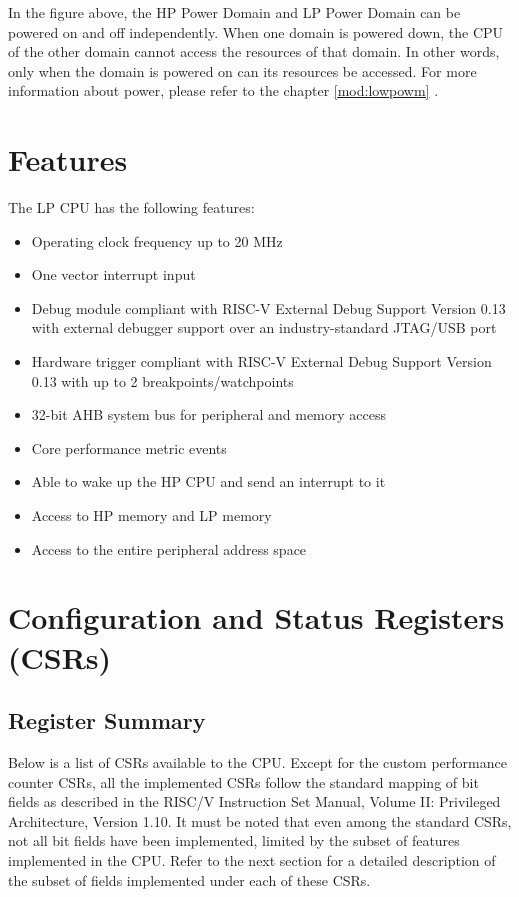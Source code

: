 \documentclass[main\_\_EN.tex]{subfiles}
\begin{document}
In the figure above, the HP Power Domain and LP Power Domain can be powered on and off independently. When one domain is powered down, the CPU of the other domain cannot access the resources of that domain. In other words, only when the domain is powered on can its resources be accessed. For more information about power, please refer to the chapter \ref{mod:lowpowm} \textit{}.

\section{Features}
\label{sec:ulp-features}

The LP CPU has the following features:

\begin{itemize}
    \item Operating clock frequency up to 20 MHz
    \item One vector interrupt input
    \item Debug module compliant with RISC-V External Debug Support Version 0.13 with external debugger support over an industry-standard JTAG/USB port
    \item Hardware trigger compliant with RISC-V External Debug Support Version 0.13 with up to 2 breakpoints/watchpoints
    \item 32-bit AHB system bus for peripheral and memory access
    \item Core performance metric events
    \item Able to wake up the HP CPU and send an interrupt to it
    \item Access to HP memory and LP memory
    \item Access to the entire peripheral address space

\end{itemize}

\section{Configuration and Status Registers (CSRs)}
\hypertarget{ulp-reg-summ}{}
\subsection{Register Summary}
\label{sec:ulp-reg-summ}


Below is a list of CSRs available to the CPU. Except for the custom performance counter CSRs, all the implemented CSRs follow the standard mapping of bit fields as described in the RISC\-/V Instruction Set Manual, Volume II: Privileged Architecture, Version 1.10. It must be noted that even among the standard CSRs, not all bit fields have been implemented, limited by the subset of features implemented in the CPU. Refer to the next section for a detailed description of the subset of fields implemented under each of these CSRs.
\end{document}
